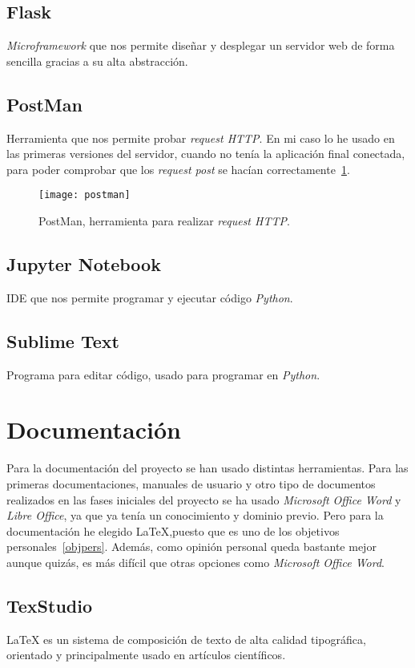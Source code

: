 \subsection{Flask}
\textit{Microframework} que nos permite diseñar y desplegar un servidor web de forma sencilla gracias a su alta abstracción.

\subsection{PostMan}
Herramienta que nos permite probar \textit{request HTTP}. En mi caso lo he usado en las primeras versiones del servidor, cuando no tenía la aplicación final conectada, para poder comprobar que los \textit{request post} se hacían correctamente~\ref{fig:postman}.

\begin{figure}
	\centering
	\texttt{[image: postman]}
	\caption{PostMan, herramienta para realizar \textit{request HTTP}.}
	\label{fig:postman}
\end{figure}
\subsection{Jupyter Notebook}
IDE que nos permite programar y ejecutar código \textit{Python}.
\subsection{Sublime Text}
Programa para editar código, usado para programar en \textit{Python}.
\section{Documentación}
Para la documentación del proyecto se han usado distintas herramientas. Para las primeras documentaciones, manuales de usuario y otro tipo de documentos realizados en las fases iniciales del proyecto se ha usado \textit{Microsoft Office Word} y \textit{Libre Office}, ya que ya tenía un conocimiento y dominio previo. Pero para la documentación he elegido \LaTeX,puesto que es uno de los objetivos personales~\ref{objpers}. Además, como opinión personal queda bastante mejor aunque quizás, es más difícil que otras opciones como \textit{Microsoft Office Word}.
\subsection{TexStudio}
\LaTeX{} es un sistema de composición de texto de alta calidad tipográfica, orientado y principalmente usado en artículos científicos.

